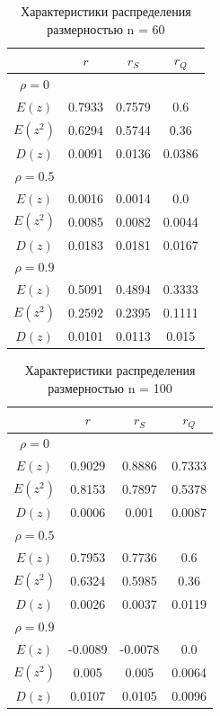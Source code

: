 \documentclass[a4paper,14pt]{article}
\begin{document}
	\begin{table}[H]
		\centering
		\begin{tabular}{|c|c|c|c|}
			\hline
			& $r$ & $r_S$ & $r_Q$\\\hline
			$\rho=0$ & & &\\\hline
			$E(z)$ & 0.7933 & 0.7579 & 0.6\\\hline
			$E(z^2)$ & 0.6294 & 0.5744 & 0.36\\\hline
			$D(z)$ & 0.0091 & 0.0136 & 0.0386\\\hline
			\hline
			$\rho=0.5$ & & &\\\hline
			$E(z)$ & 0.0016 & 0.0014 & 0.0\\\hline
			$E(z^2)$ & 0.0085 & 0.0082 & 0.0044\\\hline
			$D(z)$ & 0.0183 & 0.0181 & 0.0167\\\hline
			\hline
			$\rho=0.9$ & & &\\\hline
			$E(z)$ & 0.5091 & 0.4894 & 0.3333\\\hline
			$E(z^2)$ & 0.2592 & 0.2395 & 0.1111\\\hline
			$D(z)$ & 0.0101 & 0.0113 & 0.015\\\hline
		\end{tabular}
		\caption{Характеристики распределения размерностью n = 60}
	\end{table}
	
	\begin{table}[H]
		\centering
		\begin{tabular}{|c|c|c|c|}
			\hline
			& $r$ & $r_S$ & $r_Q$\\\hline
			$\rho=0$ & & &\\\hline
			$E(z)$ & 0.9029 & 0.8886 & 0.7333\\\hline
			$E(z^2)$ & 0.8153 & 0.7897 & 0.5378\\\hline
			$D(z)$ & 0.0006 & 0.001 & 0.0087\\\hline
			\hline
			$\rho=0.5$ & & &\\\hline
			$E(z)$ & 0.7953 & 0.7736 & 0.6\\\hline
			$E(z^2)$ & 0.6324 & 0.5985 & 0.36\\\hline
			$D(z)$ & 0.0026 & 0.0037 & 0.0119\\\hline
			\hline
			$\rho=0.9$ & & &\\\hline
			$E(z)$ & -0.0089 & -0.0078 & 0.0\\\hline
			$E(z^2)$ & 0.005 & 0.005 & 0.0064\\\hline
			$D(z)$ & 0.0107 & 0.0105 & 0.0096\\\hline
		\end{tabular}
		\caption{Характеристики распределения размерностью n = 100}
	\end{table}
	
\end{document}
